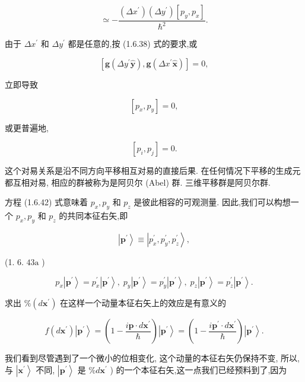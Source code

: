 \documentclass[lang=cn,newtx,10pt,scheme=chinese,thmcnt=section]{elegantbook}
\begin{document}
$$
\simeq - \frac{\left( {\Delta {x}^{\prime }}\right) \left( {\Delta {y}^{\prime }}\right) \left\lbrack {{p}_{y},{p}_{x}}\right\rbrack }{{\hbar }^{2}}.
$$

由于 $\Delta {x}^{\prime }$ 和 $\Delta {y}^{\prime }$ 都是任意的,按 (1.6.38) 式的要求,或

$$
\left\lbrack {\mathbf{g}\left( {\Delta {y}^{\prime }\widehat{\mathbf{y}}}\right) ,\mathbf{g}\left( {\Delta {x}^{\prime }\widehat{\mathbf{x}}}\right) }\right\rbrack = 0, \tag{1.6.40}
$$

立即导致

$$
\left\lbrack {{p}_{x},{p}_{y}}\right\rbrack = 0, \tag{1.6.41}
$$

或更普遍地,

$$
\left\lbrack {{p}_{i},{p}_{j}}\right\rbrack = 0. \tag{1.6.42}
$$

这个对易关系是沿不同方向平移相互对易的直接后果. 在任何情况下平移的生成元都互相对易, 相应的群被称为是阿贝尔 (Abel) 群. 三维平移群是阿贝尔群.

方程 (1.6.42) 式意味着 ${p}_{x},{p}_{y}$ 和 ${p}_{z}$ 是彼此相容的可观测量. 因此,我们可以构想一个 ${p}_{x},{p}_{y}$ 和 ${p}_{z}$ 的共同本征右矢,即

$$
\left| {\mathbf{p}}^{\prime }\right\rangle \equiv \left| {{p}_{x}^{\prime },{p}_{y}^{\prime },{p}_{z}^{\prime }}\right\rangle ,
$$

(1. 6. ${43}\mathrm{a}$ )

$$
{p}_{x}\left| {\mathbf{p}}^{\prime }\right\rangle = {p}_{x}^{\prime }\left| {\mathbf{p}}^{\prime }\right\rangle ,\;{p}_{y}\left| {\mathbf{p}}^{\prime }\right\rangle = {p}_{y}^{\prime }\left| {\mathbf{p}}^{\prime }\right\rangle ,\;{p}_{z}\left| {\mathbf{p}}^{\prime }\right\rangle = {p}_{z}^{\prime }\left| {\mathbf{p}}^{\prime }\right\rangle . \tag{1.6.43b}
$$

求出 $\% \left( {d{\mathbf{x}}^{\prime }}\right)$ 在这样一个动量本征右矢上的效应是有意义的

$$
f\left( {d{\mathbf{x}}^{\prime }}\right) \left| {\mathbf{p}}^{\prime }\right\rangle = \left( {1 - \frac{i\mathbf{p} \cdot d{\mathbf{x}}^{\prime }}{\hbar }}\right) \left| {\mathbf{p}}^{\prime }\right\rangle = \left( {1 - \frac{i{\mathbf{p}}^{\prime } \cdot d{\mathbf{x}}^{\prime }}{\hbar }}\right) \left| {\mathbf{p}}^{\prime }\right\rangle . \tag{1.6.44}
$$

我们看到尽管遇到了一个微小的位相变化, 这个动量的本征右矢仍保持不变, 所以, 与 $\left| {\mathbf{x}}^{\prime }\right\rangle$ 不同, $\left| {\mathbf{p}}^{\prime }\right\rangle$ 是 $\% d{\mathbf{x}}^{\prime }$ ) 的一个本征右矢,这一点我们已经预料到了,因为
\end{document}
